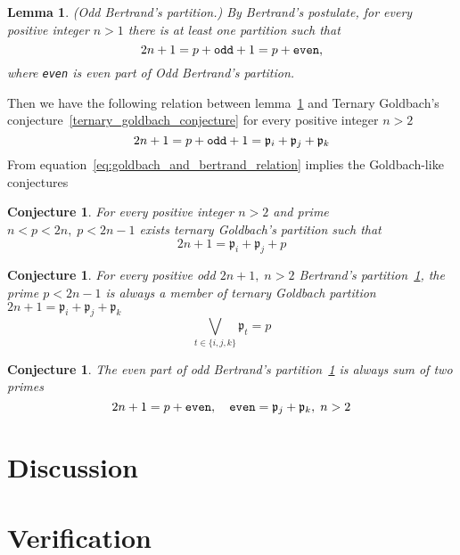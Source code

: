 \documentclass[12pt,letterpaper,oneside,reqno]{amsart}
\newtheorem{lem}{Lemma}[section]
\newtheorem{conj}[thm]{Conjecture}
\begin{document}
    \begin{lem}(Odd Bertrand's partition.)
        \label{bertrands_odd_partition_lemma}
        By Bertrand's postulate, for every positive integer $n>1$ there is at least one partition such that
        \[
            2n + 1 = p + \verb!odd! + 1 = p + \verb!even!,
        \]
        where \verb!even! is even part of Odd Bertrand's partition.
    \end{lem}
    Then we have the following relation between lemma~\ref{bertrands_odd_partition_lemma} and
    Ternary Goldbach's conjecture~\ref{ternary_goldbach_conjecture} for every positive integer $n>2$
    \begin{equation}
        2n + 1 = p + \verb!odd! + 1 = \mathfrak{p}_i +  \mathfrak{p}_j + \mathfrak{p}_k
        \label{eq:goldbach_and_bertrand_relation}
    \end{equation}
    From equation~\eqref{eq:goldbach_and_bertrand_relation} implies the Goldbach-like conjectures
    \begin{conj}
        For every positive integer $n>2$ and prime $n < p< 2n, \; p<2n-1$
        exists ternary Goldbach's partition such that
        \[
            2n+1 = \mathfrak{p}_i +  \mathfrak{p}_j + p
        \]
    \end{conj}
    \begin{conj}
        For every positive odd $2n+1, \; n>2$ Bertrand's partition~\ref{bertrands_odd_partition_lemma},
        the prime $p < 2n-1$ is always a member of ternary Goldbach partition
        $2n+1 =\mathfrak{p}_i +  \mathfrak{p}_j + \mathfrak{p}_k$
        \[
            \bigvee_{t \in \{i, j, k\}} \mathfrak{p}_t = p
        \]
    \end{conj}
    \begin{conj}
        The even part of odd Bertrand's partition~\ref{bertrands_odd_partition_lemma}
        is always sum of two primes
        \[
            2n + 1 = p + \verb!even!, \quad \verb!even! = \mathfrak{p}_j + \mathfrak{p}_k, \; n > 2
        \]
    \end{conj}


    \section{Discussion}\label{sec:discussion}
    \section{Verification}\label{sec:verification}
    
    
\end{document}
